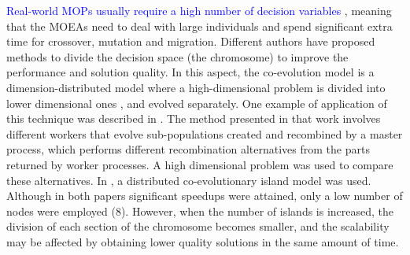 \documentclass[preprint]{elsarticle}
\begin{document}
\textcolor{blue}{Real-world MOPs usually require a high number of decision variables \cite{Zhang17DECAL,XU2018268}}, %
meaning that the
MOEAs need to deal with large individuals and spend significant extra
time for crossover, mutation and migration. %
Different authors have %
proposed methods to divide the decision space (the chromosome) to
improve the performance and solution quality. In this aspect, the
co-evolution model is a dimension-distributed model where a %
high-dimensional problem is divided into lower dimensional ones
\citep{Gong15models,Tonda12cooperative}, and evolved separately. One
example of application of this technique was described in
\citep{Kimovski15Parallel}. The method presented in that work involves
different workers that evolve sub-populations created and recombined
by a master process, which performs different recombination
alternatives from the parts returned by worker processes. A high
dimensional problem was used to compare these 
alternatives. In \citep{Dorronsoro13superlinear}, a distributed
co-evolutionary island model was used.  Although in both papers
significant speedups were attained, only a low number of nodes were
employed (8). However, when the number of islands is increased, the division
of each section of the chromosome becomes smaller, and the scalability
may be affected by obtaining lower quality solutions in the same
amount of time. 





\end{document}
